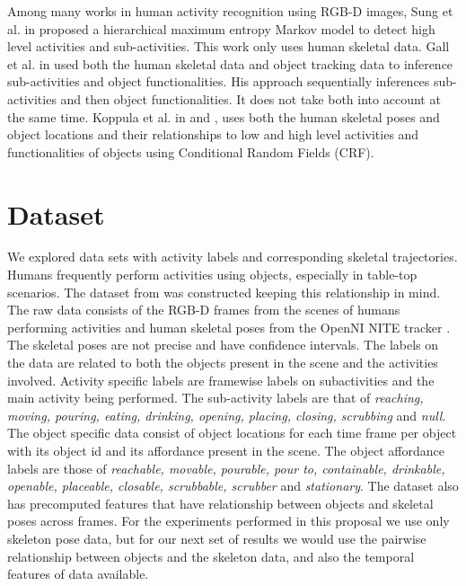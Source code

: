 \documentclass{article} %
\begin{document}
Among many works in human activity recognition using RGB-D images, Sung et al. in \cite{sung2012unstructured}
proposed a hierarchical maximum entropy Markov model to detect high level activities and sub-activities. This work only uses human skeletal data. Gall et al. in \cite{gall2011functional} used both the human skeletal data and object tracking data to inference sub-activities and object functionalities. His approach sequentially inferences sub-activities and then object functionalities. It does not take both into account at the same time. Koppula et al. in \cite{koppula2013detectingactivitiesrgbd} and \cite{koppula2013anticipating}, uses both the human skeletal poses and object locations and their relationships to low and high level activities and functionalities of objects using Conditional Random Fields (CRF).

\section{Dataset}
We explored data sets with activity labels and corresponding skeletal trajectories. Humans frequently perform activities using objects, especially in table-top scenarios. The dataset from \cite{koppula2013detectingactivitiesrgbd} was constructed keeping this relationship in mind. The raw data consists of the RGB-D frames from the scenes of humans performing activities and human skeletal poses from the OpenNI NITE tracker \cite{PrimeSense2010}. The skeletal poses are not precise and have confidence intervals. The labels on the data are related to both the objects present in the scene and the activities involved. Activity specific labels are framewise labels on subactivities	and the main activity being performed. The sub-activity labels are that of \textit{reaching, moving, pouring, eating, drinking, opening, placing, closing, scrubbing} and \textit{null}. The object specific data consist of object locations for each time frame per object with its object id and its affordance present in the scene. The object affordance labels are those of \textit{reachable, movable, pourable, pour to, containable, drinkable, openable, placeable, closable, scrubbable, scrubber} and \textit{stationary}. The dataset also has precomputed features that have relationship between objects and skeletal poses across frames. 
For the experiments performed in this proposal we use only skeleton pose data, but for our next set of results we would use the pairwise relationship between objects and the skeleton data, and also the temporal features of data available.
\end{document}
